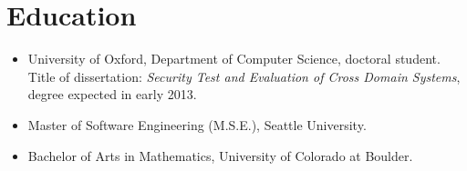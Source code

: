 \documentclass[letterpaper]{article}
\begin{document}
\section*{Education}

\begin{itemize}
    \item University of Oxford, Department of Computer Science,
		doctoral student.  Title of dissertation: \emph{Security Test
		and Evaluation of Cross Domain Systems}, degree expected in early 2013.

    \item Master of Software Engineering (M.S.E.), Seattle University. %

    \item Bachelor of Arts in Mathematics, University of Colorado at Boulder.


\end{itemize}
\end{document}

